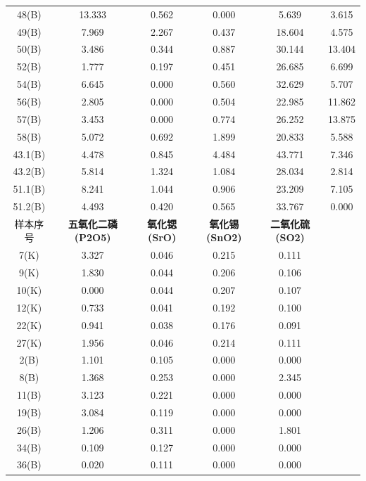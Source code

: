 \documentclass{my_paper}
\begin{document}
\begin{enumerate}
\begin{longtable}{c|ccccc}
48(B)   & 13.333 & 0.562 & 0.000  & 5.639  & 3.615  \\
49(B)   & 7.969  & 2.267 & 0.437  & 18.604 & 4.575  \\
50(B)   & 3.486  & 0.344 & 0.887  & 30.144 & 13.404 \\
52(B)   & 1.777  & 0.197 & 0.451  & 26.685 & 6.699  \\
54(B)   & 6.645  & 0.000 & 0.560  & 32.629 & 5.707  \\
56(B)   & 2.805  & 0.000 & 0.504  & 22.985 & 11.862 \\
57(B)   & 3.453  & 0.000 & 0.774  & 26.252 & 13.875 \\
58(B)   & 5.072  & 0.692 & 1.899  & 20.833 & 5.588  \\
43.1(B) & 4.478  & 0.845 & 4.484  & 43.771 & 7.346  \\
43.2(B) & 5.814  & 1.324 & 1.084  & 28.034 & 2.814  \\
51.1(B) & 8.241  & 1.044 & 0.906  & 23.209 & 7.105  \\
51.2(B) & 4.493  & 0.420 & 0.565  & 33.767 & 0.000  \\\midrule
  样本序号                 & \multicolumn{1}{c}{\textbf{五氧化二磷(P2O5)}} & \multicolumn{1}{c}{\textbf{氧化锶(SrO)}}   & \multicolumn{1}{c}{\textbf{氧化锡(SnO2)}} & \multicolumn{1}{c}{\textbf{二氧化硫(SO2)}} &                                       \\\midrule
  7(K)    & 3.327  & 0.046 & 0.215  & 0.111  &        \\
9(K)    & 1.830  & 0.044 & 0.206  & 0.106  &        \\
10(K)   & 0.000  & 0.044 & 0.207  & 0.107  &        \\
12(K)   & 0.733  & 0.041 & 0.192  & 0.100  &        \\
22(K)   & 0.941  & 0.038 & 0.176  & 0.091  &        \\
27(K)   & 1.956  & 0.046 & 0.214  & 0.111  &        \\
2(B)    & 1.101  & 0.105 & 0.000  & 0.000  &        \\
8(B)    & 1.368  & 0.253 & 0.000  & 2.345  &        \\
11(B)   & 3.123  & 0.221 & 0.000  & 0.000  &        \\
19(B)   & 3.084  & 0.119 & 0.000  & 0.000  &        \\
26(B)   & 1.206  & 0.311 & 0.000  & 1.801  &        \\
34(B)   & 0.109  & 0.127 & 0.000  & 0.000  &        \\
36(B)   & 0.020  & 0.111 & 0.000  & 0.000  &        \\

\end{longtable}
\end{enumerate}
\end{document}
